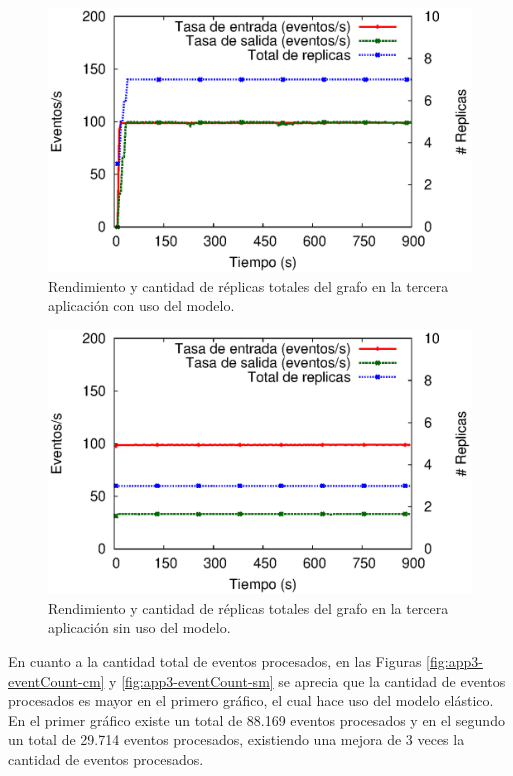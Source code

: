 \begin{figure}[!ht]
	\centering
	\includegraphics[scale=0.7]{images/exp/app3/cm/logical/processSystem.eps}
    \caption{Rendimiento y cantidad de réplicas totales del grafo en la tercera aplicación con uso del modelo.}
	\label{fig:app3-processSystem-cm}
\end{figure}

\begin{figure}[!ht]
	\centering
	\includegraphics[scale=0.7]{images/exp/app3/sm/logical/processSystem.eps}
    \caption{Rendimiento y cantidad de réplicas totales del grafo en la tercera aplicación sin uso del modelo.}
	\label{fig:app3-processSystem-sm}
\end{figure}

En cuanto a la cantidad total de eventos procesados, en las Figuras \ref{fig:app3-eventCount-cm} y \ref{fig:app3-eventCount-sm} se aprecia que la cantidad de eventos procesados es mayor en el primero gráfico, el cual hace uso del modelo elástico. En el primer gráfico existe un total de 88.169 eventos procesados y en el segundo un total de 29.714 eventos procesados, existiendo una mejora de 3 veces la cantidad de eventos procesados.

